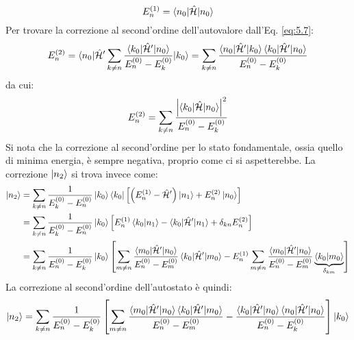 \begin{equation}
	E_n^{(1)} = \braket{n_0 | \hat{\mathcal{H}} | n_0}
	\label{eq:5.11}
\end{equation}
Per trovare la correzione al second'ordine dell'autovalore dall'Eq. \ref{eq:5.7}:
\begin{equation*}
	E_n^{(2)} = \braket{n_0 | \hat{\mathcal{H}}' \sum_{k \neq n} \frac{\braket{k_0 | \hat{\mathcal{H}}' | n_0}}{E_n^{(0)} - E_k^{(0)}} | k_0} = \sum_{k \neq n} \frac{\braket{n_0 | \hat{\mathcal{H}}' | k_0} \braket{k_0 | \hat{\mathcal{H}}' | n_0}}{E_n^{(0)} - E_k^{(0)}}
\end{equation*}
da cui:
\begin{equation}
	E_n^{(2)} = \sum_{k \neq n} \frac{\left\lvert\braket{k_0 | \hat{\mathcal{H}} | n_0}\right\rvert^2}{E_n^{(0)} - E_k^{(0)}}
	\label{eq:5.12}
\end{equation}
Si nota che la correzione al second'ordine per lo stato fondamentale, ossia quello di minima energia, è sempre negativa, proprio come ci si aspetterebbe.
La correzione $ \ket{n_2} $ si trova invece come:
\begin{equation*}
	\begin{split}
		\ket{n_2}
		&= \sum_{k \neq n} \frac{1}{E_k^{(0)} - E_n^{(0)}} \ket{k_0} \bra{k_0} \left[ \left( E_n^{(1)} - \hat{\mathcal{H}}' \right) \ket{n_1} + E_n^{(2)} \ket{n_0} \right] \\
		&= \sum_{k \neq n} \frac{1}{E_k^{(0)} - E_n^{(0)}} \ket{k_0} \left[ E_n^{(1)} \braket{k_0 | n_1} - \braket{k_0 | \hat{\mathcal{H}}' | n_1} + \delta_{kn} E_n^{(2)} \right] \\
		&= \sum_{k \neq n} \frac{1}{E_n^{(0)} - E_k^{(0)}} \ket{k_0} \left[ \sum_{m \neq n} \frac{\braket{m_0 | \hat{\mathcal{H}}' | n_0}}{E_n^{(0)} - E_m^{(0)}} \braket{k_0 | \hat{\mathcal{H}}' | m_0} - E_n^{(1)} \sum_{m \neq n} \frac{\braket{m_0 | \hat{\mathcal{H}}' | n_0}}{E_n^{(0)} - E_m^{(0)}} \underbrace{\braket{k_0 | m_0}}_{\delta_{km}} \right]
	\end{split}
\end{equation*}
La correzione al second'ordine dell'autostato è quindi:
\begin{equation}
	\ket{n_2} = \sum_{k \neq n} \frac{1}{E_n^{(0)} - E_k^{(0)}} \left[ \sum_{m \neq n} \frac{\braket{m_0 | \hat{\mathcal{H}}' | n_0} \braket{k_0 | \hat{\mathcal{H}}' | m_0}}{E_n^{(0)} - E_m^{(0)}} - \frac{\braket{k_0 | \hat{\mathcal{H}}' | n_0} \braket{n_0 | \hat{\mathcal{H}}' | n_0}}{E_n^{(0)} - E_k^{(0)}} \right] \ket{k_0}
	\label{eq:5.13}
\end{equation}










